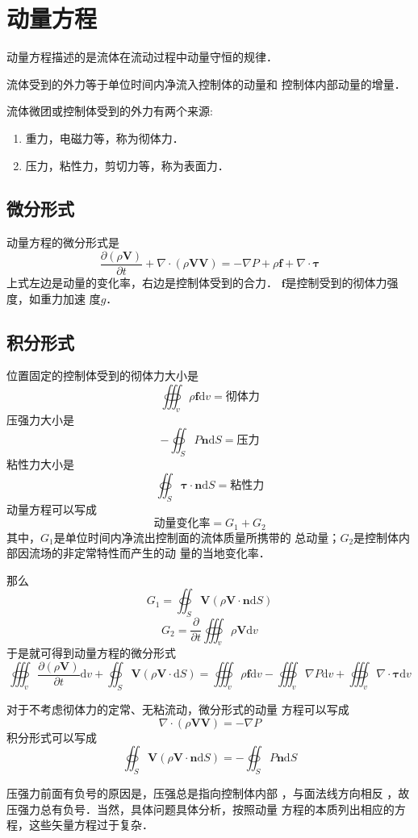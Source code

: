 \section{动量方程}
动量方程描述的是流体在流动过程中动量守恒的规律．

流体受到的外力等于单位时间内净流入控制体的动量和
控制体内部动量的增量．

\begin{notice}
	流体微团或控制体受到的外力有两个来源:
	\begin{enumerate}
		\item 重力，电磁力等，称为彻体力．
		\item 压力，粘性力，剪切力等，称为表面力．
	\end{enumerate}
\end{notice}

\subsection{微分形式}
动量方程的微分形式是
\[
	\frac{\partial (\rho \mathbf{V})}{\partial t }+
	\nabla \cdot (\rho \mathbf{VV})=
	-\nabla P+\rho \mathbf{f}+\nabla  \cdot
	\mathbf{\tau}
\]
上式左边是动量的变化率，右边是控制体受到的合力．
$\mathbf{f}$是控制受到的彻体力强度，如重力加速
度$g$．

\subsection{积分形式}
位置固定的控制体受到的彻体力大小是
\[
	\oiiint_v \rho \mathbf{f}\mathrm{d} v=\text{彻体力}
\]
压强力大小是
\[
	-\oiint_S P \mathbf{n}\mathrm{d} S=\text{压力}
\]
粘性力大小是
\[
	\oiint_S \mathbf{\tau}\cdot \mathbf{n}\mathrm{d}S=
	\text{粘性力}
\]
动量方程可以写成
\[
	\text{动量变化率}=G_1+G_2
\]
其中，$G_1$是单位时间内净流出控制面的流体质量所携带的
总动量；$G_2$是控制体内部因流场的非定常特性而产生的动
量的当地变化率．

那么
\[
	G_1=\oiint_S \mathbf{V}(\rho \mathbf{V}\cdot
	\mathbf{n}\mathrm{d}S)
\]
\[
	G_2=\frac{\partial }{\partial t }\oiiint
	_v \rho \mathbf{V}\mathrm{d}v
\]
于是就可得到动量方程的微分形式
\[
	\oiiint_v \frac{\partial (\rho \mathbf{V})}{
		\partial t}\mathrm{d} v +
	\oiint_S \mathbf{V} (\rho \mathbf{V}\cdot \mathrm{d}
	S)=\oiiint_v \rho \mathbf{f} \mathrm{d} v -
	\oiiint_v \nabla  P \mathrm{d}v +
	\oiiint_v \nabla \cdot \mathbf{\tau} \mathrm{d}v
\]

\begin{notice}
	对于不考虑彻体力的定常、无粘流动，微分形式的动量
	方程可以写成
	\[
		\nabla \cdot (\rho \mathbf{VV})=
		-\nabla  P
	\]
	积分形式可以写成
	\[
		\oiint_S \mathbf{V}(\rho \mathbf{V}\cdot
		\mathbf{n} \mathrm{d} S)=-\oiint_S P \mathbf{n}
		\mathrm{d} S
	\]
\end{notice}
\begin{note}
	压强力前面有负号的原因是，压强总是指向控制体内部
	，与面法线方向相反
	，故压强力总有负号．当然，具体问题具体分析，按照动量
	方程的本质列出相应的方程，这些矢量方程过于复杂．
\end{note}


